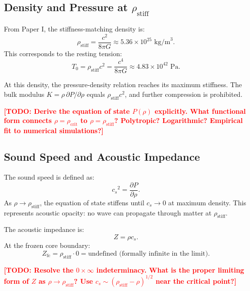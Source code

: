 \documentclass[11pt,a4paper]{article}
\newcommand{\rhocrit}{\ensuremath{\rho_{\mathrm{crit}}}}
\newcommand{\rhostiff}{\ensuremath{\rho_{\mathrm{stiff}}}}
\newcommand{\Tzero}{\ensuremath{T_0}}
\newcommand{\Kbulk}{\ensuremath{K}}
\newcommand{\cs}{\ensuremath{c_s}}
\newcommand{\Zfc}{\ensuremath{Z_{\mathrm{fc}}}}
\newcommand{\TODO}[1]{\textcolor{red}{\textbf{[TODO: #1]}}}
\theoremstyle{definition}
\theoremstyle{remark}
\begin{document}
\subsection{Density and Pressure at $\rhostiff$}
\label{sec:density_pressure}

From Paper I, the stiffness-matching density is:
\begin{equation}
\rhostiff = \frac{c^2}{8\pi G} \approx 5.36 \times 10^{25} \text{ kg/m}^3.
\end{equation}
This corresponds to the resting tension:
\begin{equation}
\Tzero = \rhostiff c^2 = \frac{c^4}{8\pi G} \approx 4.83 \times 10^{42} \text{ Pa}.
\end{equation}

At this density, the pressure-density relation reaches its maximum stiffness. The bulk modulus $\Kbulk = \rho \, \partial P/\partial \rho$ equals $\rhostiff c^2$, and further compression is prohibited.

\TODO{Derive the equation of state $P(\rho)$ explicitly. What functional form connects $\rho = \rhocrit$ to $\rho = \rhostiff$? Polytropic? Logarithmic? Empirical fit to numerical simulations?}

\subsection{Sound Speed and Acoustic Impedance}
\label{sec:sound_speed}

The sound speed is defined as:
\begin{equation}
\cs^2 = \frac{\partial P}{\partial \rho}.
\end{equation}
As $\rho \to \rhostiff$, the equation of state stiffens until $\cs \to 0$ at maximum density. This represents acoustic opacity: no wave can propagate through matter at $\rhostiff$.

\vspace{0.5em}
\noindent
The acoustic impedance is:
\begin{equation}
Z = \rho \cs.
\end{equation}
At the frozen core boundary:
\begin{equation}
\Zfc = \rhostiff \cdot 0 = \text{undefined (formally infinite in the limit)}.
\end{equation}

\TODO{Resolve the $0 \times \infty$ indeterminacy. What is the proper limiting form of $Z$ as $\rho \to \rhostiff$? Use $\cs \sim (\rhostiff - \rho)^{1/2}$ near the critical point?}
\end{document}
